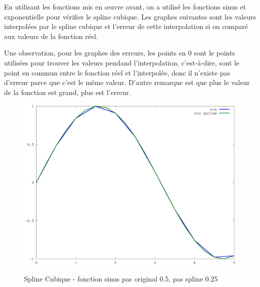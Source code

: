 \documentclass[a4paper,11pt]{article}
\begin{document}
En utilisant les  fonctions mis en œuvre avant, on a utilisé les fonctions sinus
et exponentielle pour vérifier le spline cubique. Les graphes suivantes sont les valeurs interpolées par le
spline cubique et l'erreur de cette interpolation si on comparé aux valeurs de la fonction réel.

 Une observation, pour les graphes des erreurs,  les points  en 0  sont le  points utilisées pour trouver  les valeurs
pendand l'interpolation, c'est-à-dire, sont le point en commun entre le fonction
réel et l'interpolée, donc il n'existe pas d'erreur parce que c'est le même valeur.
D'autre remarque est que plus le valeur de la fonction est grand, plus est l'erreur.

\begin{figure}[h!]
  \begin{centering}
    \includegraphics[scale=0.5]{../sinus_2}
    \label{rspro2}
    \par\end{centering}
  \caption{Spline Cubique - fonction sinus pas original 0.5, pas spline 0.25}
  \label{fig:jacobi-conv}
\end{figure}
\end{document}
